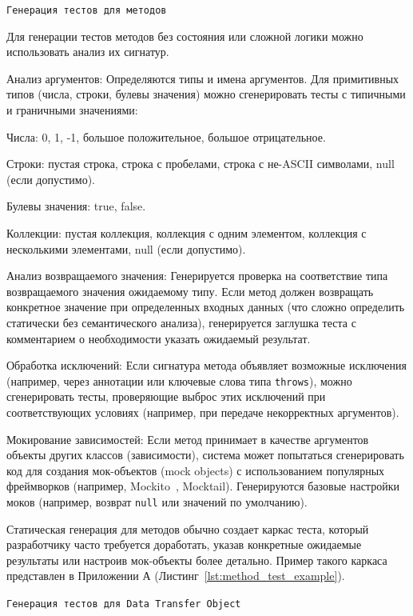\documentclass[14pt, russian]{scrartcl}
\begin{document}
\texttt{Генерация тестов для методов}

Для генерации тестов методов без состояния или сложной логики можно использовать анализ их сигнатур.

{Анализ аргументов:} Определяются типы и имена аргументов. Для примитивных типов (числа, строки, булевы значения) можно сгенерировать тесты с типичными и граничными значениями:
    \begin{itemize*}
        \item Числа: 0, 1, -1, большое положительное, большое отрицательное.
        \item Строки: пустая строка, строка с пробелами, строка с не-ASCII символами, null (если допустимо).
        \item Булевы значения: true, false.
        \item Коллекции: пустая коллекция, коллекция с одним элементом, коллекция с несколькими элементами, null (если допустимо).
    \end{itemize*}

{Анализ возвращаемого значения:} Генерируется проверка на соответствие типа возвращаемого значения ожидаемому типу. Если метод должен возвращать конкретное значение при определенных входных данных (что сложно определить статически без семантического анализа), генерируется заглушка теста с комментарием о необходимости указать ожидаемый результат.

{Обработка исключений:} Если сигнатура метода объявляет возможные исключения (например, через аннотации или ключевые слова типа \texttt{throws}), можно сгенерировать тесты, проверяющие выброс этих исключений при соответствующих условиях (например, при передаче некорректных аргументов).

{Мокирование зависимостей:} Если метод принимает в качестве аргументов объекты других классов (зависимости), система может попытаться сгенерировать код для создания мок-объектов (mock objects) с использованием популярных фреймворков (например, Mockito~\cite{MockitoDart}, Mocktail). Генерируются базовые настройки моков (например, возврат \texttt{null} или значений по умолчанию).

Статическая генерация для методов обычно создает каркас теста, который разработчику часто требуется доработать, указав конкретные ожидаемые результаты или настроив мок-объекты более детально. Пример такого каркаса представлен в Приложении А (Листинг~\ref{lst:method_test_example}).

\texttt{Генерация тестов для Data Transfer Object}
\end{document}
